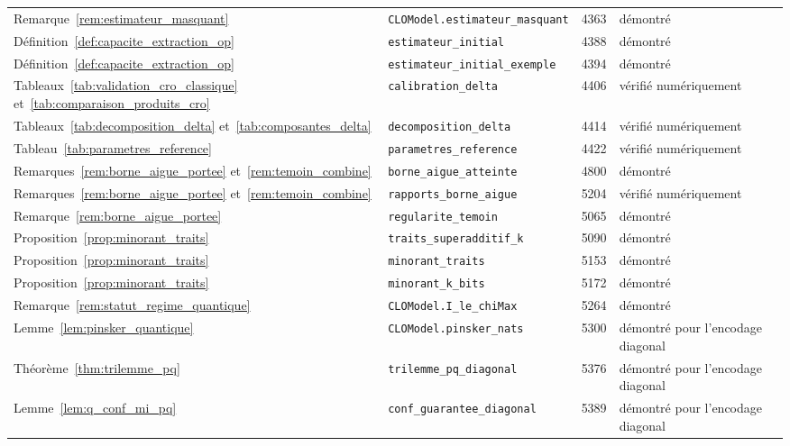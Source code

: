 {\begin{longtable}{@{}p{4.6cm}p{5.2cm}p{0.9cm}>{\raggedright\arraybackslash}p{3.6cm}@{}}
Remarque~\ref{rem:estimateur_masquant} & \texttt{CLOModel.estimateur\_\allowbreak{}masquant} & 4363 & démontré \\
Définition~\ref{def:capacite_extraction_op} & \texttt{estimateur\_\allowbreak{}initial} & 4388 & démontré \\
Définition~\ref{def:capacite_extraction_op} & \texttt{estimateur\_\allowbreak{}initial\_\allowbreak{}exemple} & 4394 & démontré \\
Tableaux~\ref{tab:validation_cro_classique} et~\ref{tab:comparaison_produits_cro} & \texttt{calibration\_\allowbreak{}delta} & 4406 & vérifié numériquement \\
Tableaux~\ref{tab:decomposition_delta} et~\ref{tab:composantes_delta} & \texttt{decomposition\_\allowbreak{}delta} & 4414 & vérifié numériquement \\
Tableau~\ref{tab:parametres_reference} & \texttt{parametres\_\allowbreak{}reference} & 4422 & vérifié numériquement \\
Remarques~\ref{rem:borne_aigue_portee} et~\ref{rem:temoin_combine} & \texttt{borne\_\allowbreak{}aigue\_\allowbreak{}atteinte} & 4800 & démontré \\
Remarques~\ref{rem:borne_aigue_portee} et~\ref{rem:temoin_combine} & \texttt{rapports\_\allowbreak{}borne\_\allowbreak{}aigue} & 5204 & vérifié numériquement \\
Remarque~\ref{rem:borne_aigue_portee} & \texttt{regularite\_\allowbreak{}temoin} & 5065 & démontré \\
Proposition~\ref{prop:minorant_traits} & \texttt{traits\_\allowbreak{}superadditif\_\allowbreak{}k} & 5090 & démontré \\
Proposition~\ref{prop:minorant_traits} & \texttt{minorant\_\allowbreak{}traits} & 5153 & démontré \\
Proposition~\ref{prop:minorant_traits} & \texttt{minorant\_\allowbreak{}k\_\allowbreak{}bits} & 5172 & démontré \\
Remarque~\ref{rem:statut_regime_quantique} & \texttt{CLOModel.I\_\allowbreak{}le\_\allowbreak{}chiMax} & 5264 & démontré \\
Lemme~\ref{lem:pinsker_quantique} & \texttt{CLOModel.pinsker\_\allowbreak{}nats} & 5300 & démontré pour l'encodage diagonal \\
Théorème~\ref{thm:trilemme_pq} & \texttt{trilemme\_\allowbreak{}pq\_\allowbreak{}diagonal} & 5376 & démontré pour l'encodage diagonal \\
Lemme~\ref{lem:q_conf_mi_pq} & \texttt{conf\_\allowbreak{}guarantee\_\allowbreak{}diagonal} & 5389 & démontré pour l'encodage diagonal \\
\end{longtable}
}

